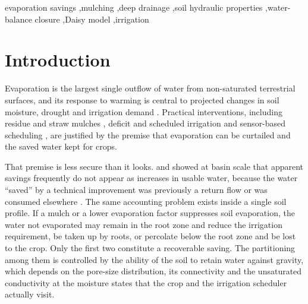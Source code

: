 \documentclass[review,12pt,authoryear]{elsarticle}
\begin{document}
\begin{frontmatter}
\begin{keyword}
evaporation savings \sep mulching \sep deep drainage \sep soil hydraulic properties \sep water-balance closure \sep Daisy model \sep irrigation
\end{keyword}
\end{frontmatter}

\linenumbers

\section{Introduction}
\label{sec:intro}
Evaporation is the largest single outflow of water from non-saturated terrestrial surfaces, and its response to warming is central to projected changes in soil moisture, drought and irrigation demand \citep{Brutsaert1998,Roderick2002,Seneviratne2010,Dai2013,Berg2018,Sherwood2014}. Practical interventions, including residue and straw mulches \citep{BalwinderSingh2011}, deficit and scheduled irrigation \citep{Fereres2007,Geerts2009} and sensor-based scheduling \citep{Datta2023}, are justified by the premise that evaporation can be curtailed and the saved water kept for crops.

That premise is less secure than it looks. \citet{Ward2008} and \citet{Grafton2018} showed at basin scale that apparent savings frequently do not appear as increases in usable water, because the water ``saved'' by a technical improvement was previously a return flow or was consumed elsewhere \citep{Perry2017,Pereira2012}. The same accounting problem exists inside a single soil profile. If a mulch or a lower evaporation factor suppresses soil evaporation, the water not evaporated may remain in the root zone and reduce the irrigation requirement, be taken up by roots, or percolate below the root zone and be lost to the crop. Only the first two constitute a recoverable saving. The partitioning among them is controlled by the ability of the soil to retain water against gravity, which depends on the pore-size distribution, its connectivity and the unsaturated conductivity at the moisture states that the crop and the irrigation scheduler actually visit.
\end{document}
